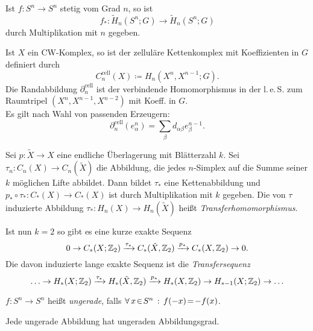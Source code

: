 \documentclass{cheat-sheet}
\newcommand{\RH}{\tilde{H}} %
\newcommand{\cell}{\text{cell}} %
\newcommand{\leS}{l.\,e.\,S.} %
\newcommand{\ZM}[1]{\Z_{#1}} %
\begin{document}
\begin{prop}
  Ist $f : S^n \to S^n$ stetig vom Grad $n$, so ist %
  \[ f_* : \RH_n(S^n; G) \to \RH_n(S^n; G) \]
  durch Multiplikation mit $n$ gegeben.
\end{prop}

\begin{defn}
  Ist $X$ ein CW-Komplex, so ist der zelluläre Kettenkomplex mit Koeffizienten in $G$ definiert durch
  \[ C_n^\cell(X) \coloneqq H_n(X^n, X^{n-1}; G). \]
  Die Randabbildung $\partial^\cell_n$ ist der verbindende Homomorphismus in der \leS{} zum Raumtripel $(X^n, X^{n-1}, X^{n-2})$ mit Koeff. in $G$. \\
  Es gilt nach Wahl von passenden Erzeugern:
  \[ \partial^\cell_n (e_\alpha^n) = \sum_\beta d_{\alpha \beta} e_\beta^{n-1}. \]
\end{defn}

\begin{defn}
  Sei $p : \tilde{X} \to X$ eine endliche Überlagerung mit Blätterzahl $k$. Sei $\tau_n : C_n(X) \to C_n(\tilde{X})$ die Abbildung, die jedes $n$-Simplex auf die Summe seiner $k$ möglichen Lifte abbildet. Dann bildet $\tau_*$ eine Kettenabbildung und $p_* \circ \tau_* : C_*(X) \to C_*(X)$ ist durch Multiplikation mit $k$ gegeben.
  Die von $\tau$ induzierte Abbildung $\tau_* : H_n(X) \to H_n(\tilde{X})$ heißt \emph{Transferhomomorphismus}.
\end{defn}

\begin{defn}
  Ist nun $k=2$ so gibt es eine kurze exakte Sequenz
  \[ 0 \to C_*(X; \ZM{2}) \xrightarrow{\tau_*} C_*(\tilde{X}, \ZM{2}) \xrightarrow{p_*} C_*(X, \ZM{2}) \to 0. \]
  Die davon induzierte lange exakte Sequenz ist die \emph{Transfersequenz}
  \[ \ldots \to H_*(X; \ZM{2}) \xrightarrow{\tau_*} H_*(\tilde{X}, \ZM{2}) \xrightarrow{p_*} H_*(X, \ZM{2}) \to H_{*-1}(X; \ZM{2}) \to \ldots \]
\end{defn}


\begin{defn}
  $f : S^n \to S^n$ heißt \emph{ungerade}, falls
  $\forall \, {x \!\in\! S^n} \,:\, f(-x) \!=\! -f(x)$.
\end{defn}

\begin{prop}
  Jede ungerade Abbildung hat ungeraden Abbildungsgrad.
\end{prop}
\end{document}
